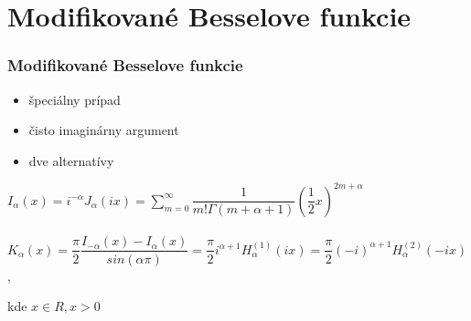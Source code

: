 \documentclass{beamer}
\begin{document}
\section{Modifikované Besselove funkcie}
\begin{frame}
\frametitle{Modifikované Besselove funkcie}
\begin{itemize}
\item špeciálny prípad
\item čisto imaginárny argument
\item dve alternatívy
\end{itemize}
\begin{center}
$I_{\alpha}(x) =i^{-\alpha}J_{\alpha}(ix) = \displaystyle\sum\limits_{m=0}^{\infty}\dfrac{1}{m!\Gamma(m+\alpha+1)}(\dfrac{1}{2}x)^{2m+\alpha} $\\
\mbox{
$K_{\alpha}(x) = \dfrac{\pi}{2}\dfrac{I_{-\alpha}(x)-I_{\alpha}(x)}{sin(\alpha\pi)} = \dfrac{\pi}{2} i^{\alpha+1}H_{\alpha}^{(1)}(ix)=\dfrac{\pi}{2} (-i)^{\alpha+1}H_{\alpha}^{(2)}(-ix)$},

\end{center}
 kde $x\in R, x>0$
 \end{frame}
\end{document}
